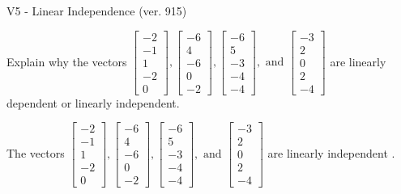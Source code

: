 \begin{exercise}
  \begin{exerciseTitle}V5 - Linear Independence (ver. 915)\end{exerciseTitle}
  \begin{exerciseStatement}
    Explain why the vectors \(\left[\begin{array}{r}
-2 \\
-1 \\
1 \\
-2 \\
0
\end{array}\right] , \left[\begin{array}{r}
-6 \\
4 \\
-6 \\
0 \\
-2
\end{array}\right] , \left[\begin{array}{r}
-6 \\
5 \\
-3 \\
-4 \\
-4
\end{array}\right] , \text{ and } \left[\begin{array}{r}
-3 \\
2 \\
0 \\
2 \\
-4
\end{array}\right]\) are linearly dependent or linearly independent.	


  \end{exerciseStatement}
  \begin{exerciseAnswer}
   The vectors \(\left[\begin{array}{r}
-2 \\
-1 \\
1 \\
-2 \\
0
\end{array}\right] , \left[\begin{array}{r}
-6 \\
4 \\
-6 \\
0 \\
-2
\end{array}\right] , \left[\begin{array}{r}
-6 \\
5 \\
-3 \\
-4 \\
-4
\end{array}\right] , \text{ and } \left[\begin{array}{r}
-3 \\
2 \\
0 \\
2 \\
-4
\end{array}\right]\) are 
  	 linearly independent  .
  


  \end{exerciseAnswer}
\end{exercise}